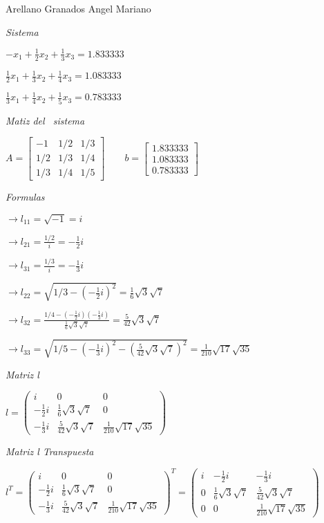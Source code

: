 \documentclass{article}
\begin{document}
\bigskip Arellano Granados Angel Mariano

\textit{Sistema}

$-x_{1}+\frac{1}{2}x_{2}+\frac{1}{3}x_{3}=1.833333$

$\frac{1}{2}x_{1}+\frac{1}{3}x_{2}+\frac{1}{4}x_{3}=1.083333$

$\frac{1}{3}x_{1}+\frac{1}{4}x_{2}+\frac{1}{5}x_{3}=0.783333$

\bigskip \textit{Matiz del \ sistema}

\thinspace $A=%
\begin{bmatrix}
-1 & 1/2 & 1/3 \\ 
1/2 & 1/3 & 1/4 \\ 
1/3 & 1/4 & 1/5%
\end{bmatrix}%
\qquad b=%
\begin{bmatrix}
1.833333 \\ 
1.083333 \\ 
0.783333%
\end{bmatrix}%
$

\bigskip \textit{Formulas}

$\rightarrow l_{11}=\sqrt{-1}=\allowbreak i$

$\rightarrow l_{21}=\frac{1/2}{i}=\allowbreak -\frac{1}{2}i$

$\rightarrow l_{31}=\frac{1/3}{i}=\allowbreak -\frac{1}{3}i$

$\rightarrow l_{22}=\sqrt{1/3-(-\frac{1}{2}i)^{2}}=\allowbreak \frac{1}{6}%
\sqrt{3}\sqrt{7}$

$\rightarrow l_{32}=\frac{1/4-(-\frac{1}{2}i)(-\frac{1}{3}i)}{\frac{1}{6}%
\sqrt{3}\sqrt{7}}=\allowbreak \frac{5}{42}\sqrt{3}\sqrt{7}$

$\rightarrow l_{33}=\sqrt{1/5-(\allowbreak -\frac{1}{3}i)^{2}-(\frac{5}{42}%
\sqrt{3}\sqrt{7})^{2}}=\allowbreak \frac{1}{210}\sqrt{17}\sqrt{35}$

\bigskip \textit{Matriz l}

$l=%
\begin{pmatrix}
\allowbreak i & 0 & 0 \\ 
-\frac{1}{2}i & \frac{1}{6}\sqrt{3}\sqrt{7} & 0 \\ 
-\frac{1}{3}i & \frac{5}{42}\sqrt{3}\sqrt{7} & \allowbreak \frac{1}{210}%
\sqrt{17}\sqrt{35}%
\end{pmatrix}%
$

\bigskip \textit{Matriz l Transpuesta}

$l^{T}=%
\begin{pmatrix}
\allowbreak i & 0 & 0 \\ 
-\frac{1}{2}i & \frac{1}{6}\sqrt{3}\sqrt{7} & 0 \\ 
-\frac{1}{3}i & \frac{5}{42}\sqrt{3}\sqrt{7} & \allowbreak \frac{1}{210}%
\sqrt{17}\sqrt{35}%
\end{pmatrix}%
^{T}=\allowbreak 
\begin{pmatrix}
i & -\frac{1}{2}i & -\frac{1}{3}i \\ 
0 & \frac{1}{6}\sqrt{3}\sqrt{7} & \frac{5}{42}\sqrt{3}\sqrt{7} \\ 
0 & 0 & \frac{1}{210}\sqrt{17}\sqrt{35}%
\end{pmatrix}%
\allowbreak $
\end{document}
